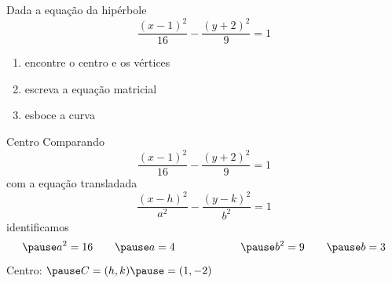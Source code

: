 \begin{question}
  Dada a equação da hipérbole
  \[
    \frac{(x-1)^2}{16} - \frac{(y+2)^2}{9} = 1
  \]
  \vspace{-1.5\baselineskip}
  \begin{enumerate}
    \item encontre o centro e os vértices
    \item escreva a equação matricial
    \item esboce a curva
  \end{enumerate}
\end{question}

\begin{resolution}{Centro}
  Comparando
  \[
    \frac{(x-1)^2}{16} - \frac{(y+2)^2}{9} = 1
  \]
  \pause
  com a equação transladada
  \[
    \frac{(x-h)^2}{a^2} - \frac{(y-k)^2}{b^2} = 1
  \]
  \pause
  identificamos
  \[
    \pause
    a^2 = 16
    \qquad
    \pause
    a = 4
    \qquad\qquad\qquad
    \pause
    b^2 = 9
    \qquad
    \pause
    b = 3
  \]
  \pause
  Centro: \quad
  \(
    \pause
    C
    = (h, k)
    \pause
    = (1, -2)
  \)
\end{resolution}

